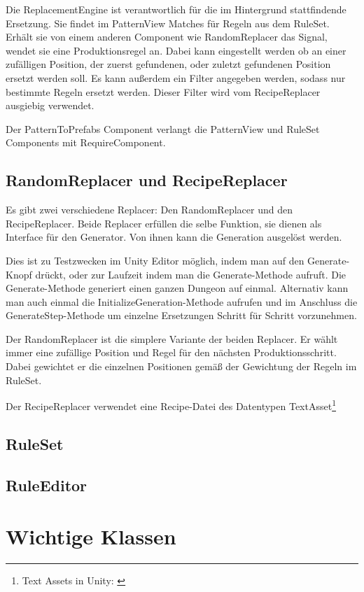 Die ReplacementEngine ist verantwortlich für die im Hintergrund stattfindende Ersetzung. Sie findet im PatternView Matches für Regeln aus dem RuleSet. Erhält sie von einem anderen Component wie RandomReplacer das Signal, wendet sie eine Produktionsregel an. Dabei kann eingestellt werden ob an einer zufälligen Position, der zuerst gefundenen, oder zuletzt gefundenen Position ersetzt werden soll. Es kann außerdem ein Filter angegeben werden, sodass nur bestimmte Regeln ersetzt werden. Dieser Filter wird vom RecipeReplacer ausgiebig verwendet.

Der PatternToPrefabs Component verlangt die PatternView und RuleSet Components mit RequireComponent.

\subsection{RandomReplacer und RecipeReplacer}

Es gibt zwei verschiedene Replacer: Den RandomReplacer und den RecipeReplacer. Beide Replacer erfüllen die selbe Funktion, sie dienen als Interface für den Generator. Von ihnen kann die Generation ausgelöst werden.

Dies ist zu Testzwecken im Unity Editor möglich, indem man auf den Generate-Knopf drückt, oder zur Laufzeit indem man die Generate-Methode aufruft. Die Generate-Methode generiert einen ganzen Dungeon auf einmal. Alternativ kann man auch einmal die InitializeGeneration-Methode aufrufen und im Anschluss die GenerateStep-Methode um einzelne Ersetzungen Schritt für Schritt vorzunehmen.

Der RandomReplacer ist die simplere Variante der beiden Replacer. Er wählt immer eine zufällige Position und Regel für den nächsten Produktionsschritt. Dabei gewichtet er die einzelnen Positionen gemäß der Gewichtung der Regeln im RuleSet.

Der RecipeReplacer verwendet eine Recipe-Datei des Datentypen TextAsset\footnote{Text Assets in Unity: \cite[Seite: class-TextAsset]{unityManual}}

\subsection{RuleSet}

\subsection{RuleEditor}

\section{Wichtige Klassen}

